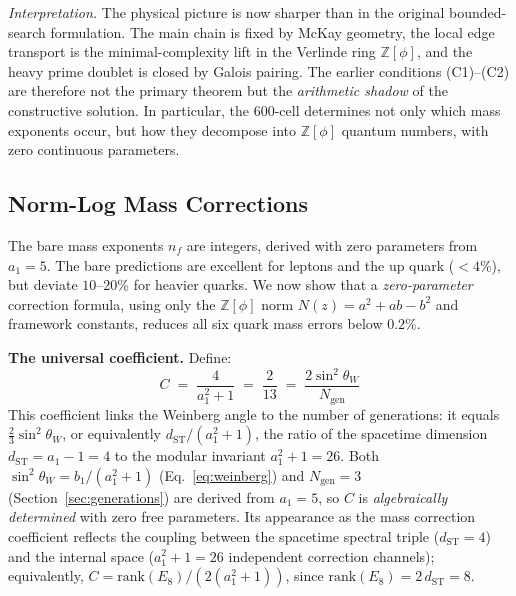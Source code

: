 \documentclass[12pt,a4paper]{article}
\theoremstyle{definition}
\begin{document}
\noindent\textit{Interpretation.}
The physical picture is now sharper than in the original bounded-search formulation.  The main chain is fixed by McKay geometry, the local edge transport is the minimal-complexity lift in the Verlinde ring $\mathbb{Z}[\phi]$, and the heavy prime doublet is closed by Galois pairing.  The earlier conditions (C1)--(C2) are therefore not the primary theorem but the \emph{arithmetic shadow} of the constructive solution.  In particular, the 600-cell determines not only which mass exponents occur, but how they decompose into $\mathbb{Z}[\phi]$ quantum numbers, with zero continuous parameters.


\subsection{Norm-Log Mass Corrections}
\label{sec:normlog}

The bare mass exponents $n_f$ are integers, derived with zero parameters from $a_1 = 5$. The bare predictions are excellent for leptons and the up quark ($< 4\%$), but deviate $10$--$20\%$ for heavier quarks. We now show that a \emph{zero-parameter} correction formula, using only the $\mathbb{Z}[\phi]$ norm $N(z) = a^2 + ab - b^2$ and framework constants, reduces all six quark mass errors below $0.2\%$.

\textbf{The universal coefficient.} Define:
\begin{equation}
\boxed{C \;=\; \frac{4}{a_1^2 + 1} \;=\; \frac{2}{13} \;=\; \frac{2\sin^2\theta_W}{N_{\text{gen}}}}
\label{eq:normlog_coeff}
\end{equation}
This coefficient links the Weinberg angle to the number of generations: it equals $\tfrac{2}{3}\sin^2\theta_W$, or equivalently $d_{\text{ST}}/(a_1^2+1)$, the ratio of the spacetime dimension $d_{\text{ST}} = a_1-1 = 4$ to the modular invariant $a_1^2+1 = 26$.  Both $\sin^2\theta_W = b_1/(a_1^2+1)$ (Eq.~\eqref{eq:weinberg}) and $N_{\text{gen}} = 3$ (Section~\ref{sec:generations}) are derived from $a_1 = 5$, so $C$ is \emph{algebraically determined} with zero free parameters.  Its appearance as the mass correction coefficient reflects the coupling between the spacetime spectral triple ($d_{\text{ST}} = 4$) and the internal space ($a_1^2+1 = 26$ independent correction channels); equivalently, $C = \mathrm{rank}(E_8)/(2(a_1^2+1))$, since $\mathrm{rank}(E_8) = 2\,d_{\text{ST}} = 8$.
\end{document}
